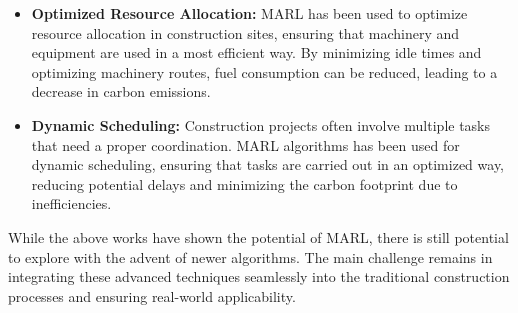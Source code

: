 \documentclass[conference]{IEEEtran}
\begin{document}
\begin{itemize}

\item \textbf{Optimized Resource Allocation:}
MARL has been used to optimize resource allocation in construction sites, ensuring that machinery and equipment are used in a most efficient way. By minimizing idle times and optimizing machinery routes, fuel consumption can be reduced, leading to a decrease in carbon emissions\cite{resource_allocation}.

\item \textbf{Dynamic Scheduling:}
Construction projects often involve multiple tasks that need a proper coordination. MARL algorithms has been used for dynamic scheduling, ensuring that tasks are carried out in an optimized way, reducing potential delays and minimizing the carbon footprint due to inefficiencies\cite{dynamic_scheduling}.

\end{itemize}

While the above works have shown the potential of MARL, there is still potential to explore with the advent of newer algorithms. The main challenge remains in integrating these advanced techniques seamlessly into the traditional construction processes and ensuring real-world applicability.

\noindent




\newpage


\end{document}
